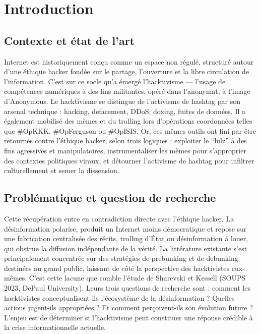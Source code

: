 \section{Introduction}

\subsection{Contexte et état de l’art}

Internet est historiquement conçu comme un espace non régulé, structuré autour d’une éthique hacker fondée sur le partage, l’ouverture et la libre circulation de l’information. C’est sur ce socle qu’a émergé l’hacktivisme — l’usage de compétences numériques à des fins militantes, opéré dans l’anonymat, à l’image d’Anonymous.
\medskip
Le hacktivisme se distingue de l’activisme de hashtag par son arsenal technique : hacking, defacement, DDoS, doxing, fuites de données. Il a également mobilisé des mèmes et du trolling lors d’opérations coordonnées telles que #OpKKK, #OpFerguson ou #OpISIS.
\medskip
Or, ces mêmes outils ont fini par être retournés contre l’éthique hacker, selon trois logiques : exploiter le “lulz” à des fins agressives et manipulatoires, instrumentaliser les mèmes pour s’approprier des contextes politiques viraux, et détourner l’activisme de hashtag pour infiltrer culturellement et semer la dissension.

\subsection{Problématique et question de recherche}

Cette récupération entre en contradiction directe avec l’éthique hacker. La désinformation polarise, produit un Internet moins démocratique et repose sur une fabrication centralisée des récits,  trolling d’État ou désinformation à louer, qui obstrue la diffusion indépendante de la vérité.
\medskip
La littérature existante s’est principalement concentrée sur des stratégies de prebunking et de debunking destinées au grand public, laissant de côté la perspective des hacktivistes eux-mêmes. C’est cette lacune que comble l’étude de Sharevski et Kessell (SOUPS 2023, DePaul University). Leurs trois questions de recherche sont : comment les hacktivistes conceptualisent-ils l’écosystème de la désinformation ? Quelles actions jugent-ils appropriées ? Et comment perçoivent-ils son évolution future ? L’enjeu est de déterminer si l’hacktivisme peut constituer une réponse crédible à la crise informationnelle actuelle.
